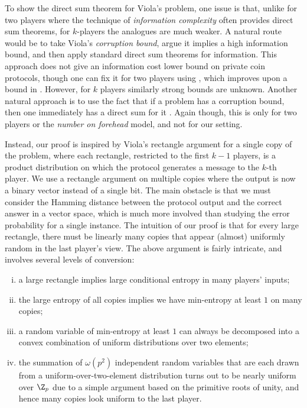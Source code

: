 To show the direct sum theorem for Viola's problem, 
one issue is that, unlike for two players where the technique
of \emph{information
complexity} often provides direct sum theorems, 
for $k$-players the analogues are much weaker. A natural route would be
to take Viola's \emph{corruption bound}, argue it implies a high
information bound, and then apply standard direct sum theorems for
information. This approach does not give an information cost lower
bound on private coin protocols, though one can fix it for two players
using \cite{bg14}, which improves upon a bound in \cite{BBKLSV16}.
However, for $k$ players similarly strong
bounds are unknown. 
Another natural approach is to use the fact
that if a problem has a corruption bound, then one immediately has 
a direct sum for it \cite{BPSW05}. Again though, this is only for two players or
the \emph{number on forehead} model, and not for 
our setting. 

Instead, our proof is inspired by Viola's rectangle argument 
for a single copy of the \sumequal problem, 
where each rectangle, restricted to the first
$k-1$ players, is a product distribution on 
which the protocol generates a message to the $k$-th player. 
We use a rectangle argument on multiple copies where the output 
is now a binary vector instead of a single bit.
The main obstacle is that we must consider the Hamming distance between the protocol output and the correct answer in a vector space,
which is much more involved than studying the error probability for a 
single instance.
The intuition of our proof is that for every large rectangle,
there must be linearly many copies that appear (almost) uniformly 
random in the last player's view.
The above argument is fairly intricate, and involves several levels of 
conversion:
%
%
\begin{enumerate}[(i)]  %
\item a large rectangle implies large conditional entropy in many players' inputs;
\item the large entropy of all copies implies we have min-entropy at least $1$ on many copies;
\item a random variable of min-entropy at least $1$ can always be  decomposed into a convex combination of uniform distributions over two elements;
\item the summation {\color{black} of $\omega(p^2)$} independent random variables that are each drawn from a uniform-over-two-element distribution turns out to be nearly uniform {\color{black} over $\Z_p$ due to a simple argument based on the primitive roots of unity},
and hence many \sumequal copies look uniform to the last player.
\end{enumerate}
%
%

